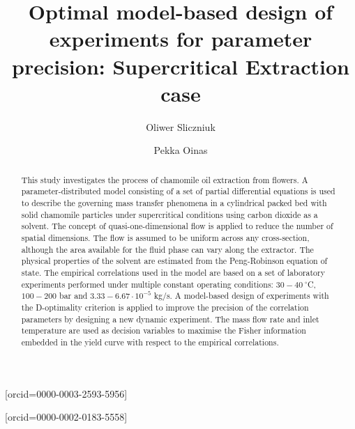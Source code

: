 \documentclass[a4paper,fleqn]{cas-dc}
\begin{document}
 

\title[mode=title]{Optimal model-based design of experiments for parameter precision: Supercritical Extraction case}                      


\author[1]{Oliwer Sliczniuk}[orcid=0000-0003-2593-5956]
\cormark[1]

\author[1]{Pekka Oinas}[orcid=0000-0002-0183-5558]


\address[1]{Aalto University, School of Chemical Engineering, Espoo, 02150, Finland}


\begin{abstract}
	This study investigates the process of chamomile oil extraction from flowers. A parameter-distributed model consisting of a set of partial differential equations is used to describe the governing mass transfer phenomena in a cylindrical packed bed with solid chamomile particles under supercritical conditions using carbon dioxide as a solvent. The concept of quasi-one-dimensional flow is applied to reduce the number of spatial dimensions. The flow is assumed to be uniform across any cross-section, although the area available for the fluid phase can vary along the extractor. The physical properties of the solvent are estimated from the Peng-Robinson equation of state. The empirical correlations used in the model are based on a set of laboratory experiments performed under multiple constant operating conditions: $30 - 40~^\circ$C, $100 - 200$ bar and $3.33-6.67 \cdot 10^{-5}$ kg/s. A model-based design of experiments with the D-optimality criterion is applied to improve the precision of the correlation parameters by designing a new dynamic experiment. The mass flow rate and inlet temperature are used as decision variables to maximise the Fisher information embedded in the yield curve with respect to the empirical correlations. 
	
\end{abstract}
\end{document}
